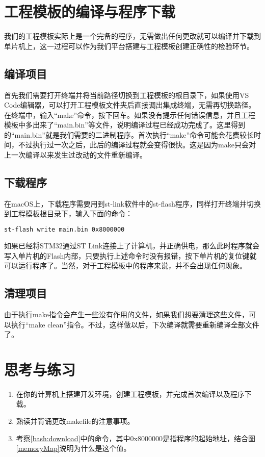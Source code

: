 \section{工程模板的编译与程序下载}
我们的工程模板实际上是一个完备的程序，无需做出任何更改就可以编译并下载到单片机上，这一过程可以作为我们平台搭建与工程模板创建正确性的检验环节。
\subsection{编译项目}
首先我们需要打开终端并将当前路径切换到工程模板的根目录下，如果使用VS Code编辑器，可以打开工程模板文件夹后直接调出集成终端，无需再切换路径。在终端中，输入“make”命令，按下回车。如果没有提示任何错误信息，并且工程模板中多出来了“main.bin”等文件，说明编译过程已经成功完成了。这里得到的“main.bin”就是我们需要的二进制程序。首次执行“make”命令可能会花费较长时间，不过执行过一次之后，此后的编译过程就会变得很快。这是因为make只会对上一次编译以来发生过改动的文件重新编译。
\subsection{下载程序}
在macOS上，下载程序需要用到st-link软件中的st-flash程序，同样打开终端并切换到工程模板根目录下，输入下面的命令：
\par 
\begin{lstlisting}[language=bash, style=customStyleBashLight]
st-flash write main.bin 0x8000000
\end{lstlisting}
\label{bash:download}
\par
如果已经将STM32通过ST Link连接上了计算机，并正确供电，那么此时程序就会写入单片机的Flash内部，只要执行上述命令时没有报错，按下单片机的复位键就可以运行程序了。当然，对于工程模板中的程序来说，并不会出现任何现象。
\subsection{清理项目}
由于执行make指令会产生一些没有作用的文件，如果我们想要清理这些文件，可以执行“make clean”指令。不过，这样做以后，下次编译就需要重新编译全部文件了。

\section{思考与练习}
\begin{enumerate}
	\item 在你的计算机上搭建开发环境，创建工程模板，并完成首次编译以及程序下载。
	\item 熟读并背诵更改makefile的注意事项。
	\item 考察\ref{bash:download}中的命令，其中0x8000000是指程序的起始地址，结合图\ref{memoryMap}说明为什么是这个值。
\end{enumerate}




















